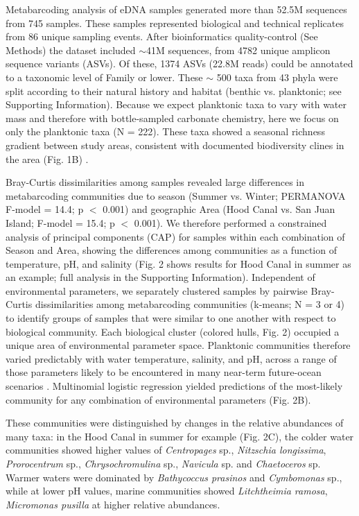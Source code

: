 \documentclass[11pt]{article}
\begin{document}
\begin{linenumbers}
Metabarcoding analysis of eDNA samples generated more than 52.5M sequences from 745 samples. These samples represented biological and technical replicates from 86 unique sampling events. After bioinformatics quality-control (See Methods) the dataset included $\sim${}41M sequences, from 4782 unique amplicon sequence variants (ASVs). Of these, 1374 ASVs (22.8M reads) could be annotated to a taxonomic level of Family or lower. These $\sim$ 500 taxa from 43 phyla were split according to their natural history and habitat (benthic vs. planktonic; see Supporting Information). Because we expect planktonic taxa to vary with water mass \cite{kelly2018tides} and therefore with bottle-sampled carbonate chemistry, here we focus on only the planktonic taxa (N = 222). These taxa showed a seasonal richness gradient between study areas, consistent with documented biodiversity clines in the area (Fig. 1B) \cite{dethier_decadal_2008}.

Bray-Curtis dissimilarities among samples revealed large differences in metabarcoding communities due to season (Summer vs. Winter; PERMANOVA F-model = 14.4; p $<$ 0.001) and geographic Area (Hood Canal vs. San Juan Island; F-model = 15.4; p $<$ 0.001). We therefore performed a constrained analysis of principal components (CAP) for samples within each combination of Season and Area, showing the differences among communities as a function of temperature, pH, and salinity (Fig. 2 shows results for Hood Canal in summer as an example; full analysis in the Supporting Information). Independent of environmental parameters, we separately clustered samples by pairwise Bray-Curtis dissimilarities among metabarcoding communities (k-means; N = 3 or 4) to identify groups of samples that were similar to one another with respect to biological community. Each biological cluster (colored hulls, Fig. 2) occupied a unique area of environmental parameter space. Planktonic communities therefore varied predictably with water temperature, salinity, and pH, across a range of those parameters likely to be encountered in many near-term future-ocean scenarios \cite{murray2015inland}. 
 Multinomial logistic regression yielded predictions of the most-likely community for any combination of environmental parameters (Fig. 2B).

These communities were distinguished by changes in the relative abundances of many taxa: in the Hood Canal in summer for example (Fig. 2C), the colder water communities showed higher values of \textit{Centropages} sp., \textit{Nitzschia longissima}, \textit{Prorocentrum} sp., \textit{Chrysochromulina} sp., \textit{Navicula} sp. and \textit{Chaetoceros} sp. Warmer waters were dominated by \textit{Bathycoccus prasinos} and \textit{Cymbomonas} sp., while at lower pH values, marine communities showed \textit{Litchtheimia ramosa}, \textit{Micromonas pusilla} at higher relative abundances.   


\end{linenumbers}
\end{document}
